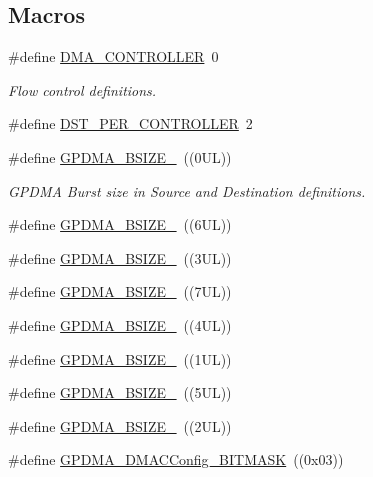 \subsection*{Macros}
\begin{DoxyCompactItemize}
\item 
\#define \hyperlink{group__GPDMA__17XX__40XX_ga42385ba8b249b55d8a140a7c35f41c35}{D\+M\+A\+\_\+\+C\+O\+N\+T\+R\+O\+L\+L\+ER}~0
\begin{DoxyCompactList}\small\item\em Flow control definitions. \end{DoxyCompactList}\item 
\#define \hyperlink{group__GPDMA__17XX__40XX_ga09bdacfb969a90a403f99d379c34638c}{D\+S\+T\+\_\+\+P\+E\+R\+\_\+\+C\+O\+N\+T\+R\+O\+L\+L\+ER}~2
\item 
\#define \hyperlink{group__GPDMA__17XX__40XX_gafd44c148b998d28bc156b947794ad011}{G\+P\+D\+M\+A\+\_\+\+B\+S\+I\+Z\+E\+\_}~((0\+U\+L))
\begin{DoxyCompactList}\small\item\em G\+P\+D\+MA Burst size in Source and Destination definitions. \end{DoxyCompactList}\item 
\#define \hyperlink{group__GPDMA__17XX__40XX_ga808a32404cd29d656eb9ee31dacacdbb}{G\+P\+D\+M\+A\+\_\+\+B\+S\+I\+Z\+E\+\_}~((6\+U\+L))
\item 
\#define \hyperlink{group__GPDMA__17XX__40XX_ga6a56379136d5416a0799642fa2217fe2}{G\+P\+D\+M\+A\+\_\+\+B\+S\+I\+Z\+E\+\_}~((3\+U\+L))
\item 
\#define \hyperlink{group__GPDMA__17XX__40XX_gad11cb83bebe2dc426f62cded244ea391}{G\+P\+D\+M\+A\+\_\+\+B\+S\+I\+Z\+E\+\_}~((7\+U\+L))
\item 
\#define \hyperlink{group__GPDMA__17XX__40XX_ga2ebaf7a771f5bf603ecfed0503a66c5c}{G\+P\+D\+M\+A\+\_\+\+B\+S\+I\+Z\+E\+\_}~((4\+U\+L))
\item 
\#define \hyperlink{group__GPDMA__17XX__40XX_ga768f1f0d1cf1a2611573362ed7b6a18d}{G\+P\+D\+M\+A\+\_\+\+B\+S\+I\+Z\+E\+\_}~((1\+U\+L))
\item 
\#define \hyperlink{group__GPDMA__17XX__40XX_gababd7d98382dd69ae09a9a4b447a0977}{G\+P\+D\+M\+A\+\_\+\+B\+S\+I\+Z\+E\+\_}~((5\+U\+L))
\item 
\#define \hyperlink{group__GPDMA__17XX__40XX_ga21239562985215b67c024871f804f0bd}{G\+P\+D\+M\+A\+\_\+\+B\+S\+I\+Z\+E\+\_}~((2\+U\+L))
\item 
\#define \hyperlink{group__GPDMA__17XX__40XX_gad882001a1a177628f45ffa5a57a2c894}{G\+P\+D\+M\+A\+\_\+\+D\+M\+A\+C\+Config\+\_\+\+B\+I\+T\+M\+A\+SK}~((0x03))

\end{DoxyCompactItemize}
